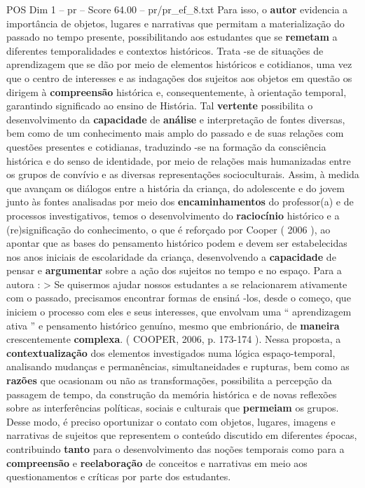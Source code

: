 \begin{textsample}{POS Dim 1 – pr – Score 64.00 – pr/pr\_ef\_8.txt}
Para isso, o \textbf{autor} evidencia a importância de objetos, lugares e narrativas que permitam a materialização do passado no tempo presente, possibilitando aos estudantes que se \textbf{remetam} a diferentes temporalidades e contextos históricos.
Trata -se de situações de aprendizagem que se dão por meio de elementos históricos e cotidianos, uma vez que o centro de interesses e as indagações dos sujeitos aos objetos em questão os dirigem à \textbf{compreensão} histórica e, consequentemente, à orientação temporal, garantindo significado ao ensino de História.
Tal \textbf{vertente} possibilita o desenvolvimento da \textbf{capacidade} de \textbf{análise} e interpretação de fontes diversas, bem como de um conhecimento mais amplo do passado e de suas relações com questões presentes e cotidianas, traduzindo -se na formação da consciência histórica e do senso de identidade, por meio de relações mais humanizadas entre os grupos de convívio e as diversas representações socioculturais.
Assim, à medida que avançam os diálogos entre a história da criança, do adolescente e do jovem junto às fontes analisadas por meio dos \textbf{encaminhamentos} do professor(a) e de processos investigativos, temos o desenvolvimento do \textbf{raciocínio} histórico e a (re)significação do conhecimento, o que é reforçado por Cooper ( 2006 ), ao apontar que as bases do pensamento histórico podem e devem ser estabelecidas nos anos iniciais de escolaridade da criança, desenvolvendo a \textbf{capacidade} de pensar e \textbf{argumentar} sobre a ação dos sujeitos no tempo e no espaço.
Para a autora : > Se quisermos ajudar nossos estudantes a se relacionarem ativamente com o passado, precisamos encontrar formas de ensiná -los, desde o começo, que iniciem o processo com eles e seus interesses, que envolvam uma “ aprendizagem ativa ” e pensamento histórico genuíno, mesmo que embrionário, de \textbf{maneira} crescentemente \textbf{complexa}. ( COOPER, 2006, p. 173-174 ).
Nessa proposta, a \textbf{contextualização} dos elementos investigados numa lógica espaço-temporal, analisando mudanças e permanências, simultaneidades e rupturas, bem como as \textbf{razões} que ocasionam ou não as transformações, possibilita a percepção da passagem de tempo, da construção da memória histórica e de novas reflexões sobre as interferências políticas, sociais e culturais que \textbf{permeiam} os grupos.
Desse modo, é preciso oportunizar o contato com objetos, lugares, imagens e narrativas de sujeitos que representem o conteúdo discutido em diferentes épocas, contribuindo \textbf{tanto} para o desenvolvimento das noções temporais como para a \textbf{compreensão} e \textbf{reelaboração} de conceitos e narrativas em meio aos questionamentos e críticas por parte dos estudantes.

\end{textsample}

